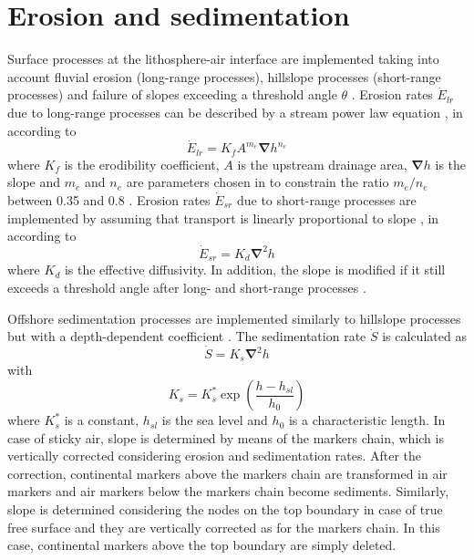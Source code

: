 \documentclass[hidelinks,11pt,a4paper]{article}
\begin{document}
\section{Erosion and sedimentation}\label{sec:erosion}
Surface processes at the lithosphere-air interface are implemented taking into account fluvial erosion (long-range processes), hillslope processes (short-range processes) and failure of slopes exceeding a threshold angle $\theta$ \citep{Burov1997,Tucker1999,Sacek2012,Croissant2014,Ueda2015,Beucher2020}. Erosion rates $\dot{E}_{lr}$ due to long-range processes can be described by a stream power law equation \citep{Tucker1999,Ueda2015,Beucher2020}, in according to
\begin{equation}
\dot{E}_{lr}=K_f A^{m_e} \bm{\nabla} h^{n_e}
\end{equation}
where $K_f$ is the erodibility coefficient, $A$ is the upstream drainage area, $\bm{\nabla} h$ is the slope and $m_e$ and $n_e$ are parameters chosen in to constrain the ratio $m_e/n_e$ between 0.35 and 0.8 \citep{Croissant2014,Ueda2015,Beucher2020}. Erosion rates $\dot{E}_{sr}$ due to short-range processes are implemented by assuming that transport is linearly proportional to slope \citep{Burov1997,Ueda2015,Beucher2020}, in according to
\begin{equation}
\dot{E}_{sr}=K_d \bm{\nabla}^2 h
\end{equation}
where $K_d$ is the effective diffusivity. In addition, the slope is modified if it still exceeds a threshold angle after long- and short-range processes \citep{Ueda2015}.

Offshore sedimentation processes are implemented similarly to hillslope processes but with a depth-dependent coefficient \citep{Sacek2012,Beucher2020}. The sedimentation rate $\dot{S}$ is calculated as
\begin{equation}
\dot{S}=K_s \bm{\nabla}^2 h
\end{equation}
with
\begin{equation}
K_s=K^*_s \exp\left(\frac{h-h_{sl}}{h_0}\right)
\end{equation}
where $K^*_s$ is a constant, $h_{sl}$ is the sea level and $h_0$ is a characteristic length. In case of sticky air, slope is determined by means of the markers chain, which is vertically corrected considering erosion and sedimentation rates. After the correction, continental markers above the markers chain are transformed in air markers and air markers below the markers chain become sediments. Similarly, slope is determined considering the nodes on the top boundary in case of true free surface and they are vertically corrected as for the markers chain. In this case, continental markers above the top boundary are simply deleted.
\end{document}
